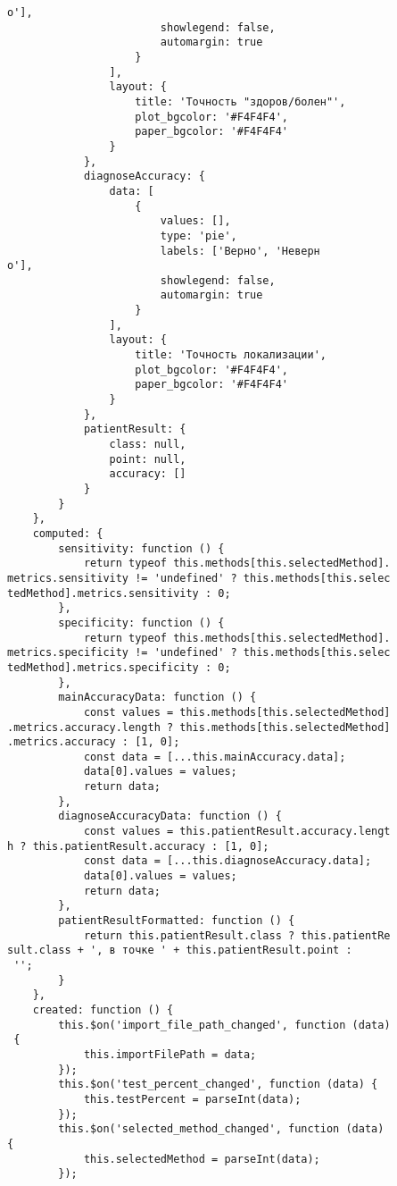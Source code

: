 \begin{verbatim}
о'],
                        showlegend: false,
                        automargin: true
                    }
                ],
                layout: {
                    title: 'Точность "здоров/болен"',
                    plot_bgcolor: '#F4F4F4',
                    paper_bgcolor: '#F4F4F4'
                }
            },
            diagnoseAccuracy: {
                data: [
                    {
                        values: [],
                        type: 'pie',
                        labels: ['Верно', 'Неверн
о'],
                        showlegend: false,
                        automargin: true
                    }
                ],
                layout: {
                    title: 'Точность локализации',
                    plot_bgcolor: '#F4F4F4',
                    paper_bgcolor: '#F4F4F4'
                }
            },
            patientResult: {
                class: null,
                point: null,
                accuracy: []
            }
        }
    },
    computed: {
        sensitivity: function () {
            return typeof this.methods[this.selectedMethod].
metrics.sensitivity != 'undefined' ? this.methods[this.selec
tedMethod].metrics.sensitivity : 0;
        },
        specificity: function () {
            return typeof this.methods[this.selectedMethod].
metrics.specificity != 'undefined' ? this.methods[this.selec
tedMethod].metrics.specificity : 0;
        },
        mainAccuracyData: function () {
            const values = this.methods[this.selectedMethod]
.metrics.accuracy.length ? this.methods[this.selectedMethod]
.metrics.accuracy : [1, 0];
            const data = [...this.mainAccuracy.data];
            data[0].values = values;
            return data;
        },
        diagnoseAccuracyData: function () {
            const values = this.patientResult.accuracy.lengt
h ? this.patientResult.accuracy : [1, 0];
            const data = [...this.diagnoseAccuracy.data];
            data[0].values = values;
            return data;
        },
        patientResultFormatted: function () {
            return this.patientResult.class ? this.patientRe
sult.class + ', в точке ' + this.patientResult.point :
 '';
        }
    },
    created: function () {
        this.$on('import_file_path_changed', function (data)
 {
            this.importFilePath = data;
        });
        this.$on('test_percent_changed', function (data) {
            this.testPercent = parseInt(data);
        });
        this.$on('selected_method_changed', function (data) 
{
            this.selectedMethod = parseInt(data);
        });

\end{verbatim}
